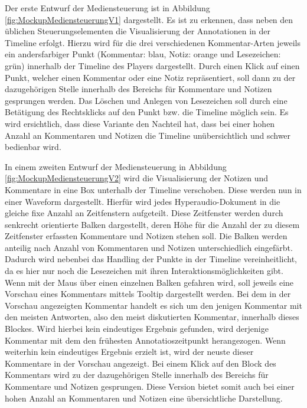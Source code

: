 Der erste Entwurf der Mediensteuerung ist in Abbildung \ref{fig:MockupMediensteuerungV1} dargestellt. Es ist zu erkennen, dass neben den üblichen Steuerungselementen die Visualisierung der Annotationen in der Timeline erfolgt. Hierzu wird für die drei verschiedenen Kommentar-Arten jeweils ein andersfarbiger Punkt (Kommentar: blau, Notiz: orange und Lesezeichen: grün) innerhalb der Timeline des Players dargestellt. Durch einen Klick auf einen Punkt, welcher einen Kommentar oder eine Notiz repräsentiert, soll dann zu der dazugehörigen Stelle innerhalb des Bereichs für Kommentare und Notizen gesprungen werden. Das Löschen und Anlegen von Lesezeichen soll durch eine Betätigung des Rechtsklicks auf den Punkt bzw. die Timeline möglich sein. Es wird ersichtlich, dass diese Variante den Nachteil hat, dass bei einer hohen Anzahl an Kommentaren und Notizen die Timeline unübersichtlich und schwer bedienbar wird.

In einem zweiten Entwurf der Mediensteuerung in Abbildung \ref{fig:MockupMediensteuerungV2} wird die Visualisierung der Notizen und Kommentare in eine Box unterhalb der Timeline verschoben. Diese werden nun in einer Waveform dargestellt. Hierfür wird jedes Hyperaudio-Dokument in die gleiche fixe Anzahl an Zeitfenstern aufgeteilt. Diese Zeitfenster werden durch senkrecht orientierte Balken dargestellt, deren Höhe für die Anzahl der zu diesem Zeitfenster erfassten Kommentare und Notizen stehen soll. Die Balken werden anteilig nach Anzahl von Kommentaren und Notizen unterschiedlich eingefärbt. Dadurch wird nebenbei das Handling der Punkte in der Timeline vereinheitlicht, da es hier nur noch die Lesezeichen mit ihren Interaktionsmöglichkeiten gibt. Wenn mit der Maus über einen einzelnen Balken gefahren wird, soll jeweils eine Vorschau eines Kommentars mittels Tooltip dargestellt werden. Bei dem in der Vorschau angezeigten Kommentar handelt es sich um den jenigen Kommentar mit den meisten Antworten, also den meist diskutierten Kommentar, innerhalb dieses Blockes. Wird hierbei kein eindeutiges Ergebnis gefunden, wird derjenige Kommentar mit dem den frühesten Annotatioszeitpunkt herangezogen. Wenn weiterhin kein eindeutiges Ergebnis erzielt ist, wird der neuste dieser Kommentare in der Vorschau angezeigt. Bei einem Klick auf den Block des Kommentars wird zu der dazugehörigen Stelle innerhalb des Bereichs für Kommentare und Notizen gesprungen. Diese Version bietet somit auch bei einer hohen Anzahl an Kommentaren und Notizen eine übersichtliche Darstellung.

